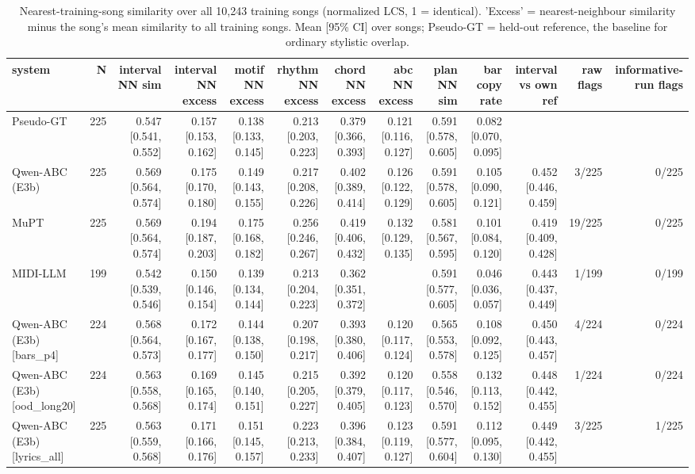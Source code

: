\begin{table}[t]
\centering
\small
\begin{tabular}{lrrrrrrrrrrrr}
\toprule
system & N & interval NN sim & interval NN excess & motif NN excess & rhythm NN excess & chord NN excess & abc NN excess & plan NN sim & bar copy rate & interval vs own ref & raw flags & informative-run flags \\
\midrule
Pseudo-GT & 225 & 0.547 [0.541, 0.552] & 0.157 [0.153, 0.162] & 0.138 [0.133, 0.145] & 0.213 [0.203, 0.223] & 0.379 [0.366, 0.393] & 0.121 [0.116, 0.127] & 0.591 [0.578, 0.605] & 0.082 [0.070, 0.095] &  &  &  \\
Qwen-ABC (E3b) & 225 & 0.569 [0.564, 0.574] & 0.175 [0.170, 0.180] & 0.149 [0.143, 0.155] & 0.217 [0.208, 0.226] & 0.402 [0.389, 0.414] & 0.126 [0.122, 0.129] & 0.591 [0.578, 0.605] & 0.105 [0.090, 0.121] & 0.452 [0.446, 0.459] & 3/225 & 0/225 \\
MuPT & 225 & 0.569 [0.564, 0.574] & 0.194 [0.187, 0.203] & 0.175 [0.168, 0.182] & 0.256 [0.246, 0.267] & 0.419 [0.406, 0.432] & 0.132 [0.129, 0.135] & 0.581 [0.567, 0.595] & 0.101 [0.084, 0.120] & 0.419 [0.409, 0.428] & 19/225 & 0/225 \\
MIDI-LLM & 199 & 0.542 [0.539, 0.546] & 0.150 [0.146, 0.154] & 0.139 [0.134, 0.144] & 0.213 [0.204, 0.223] & 0.362 [0.351, 0.372] &  & 0.591 [0.577, 0.605] & 0.046 [0.036, 0.057] & 0.443 [0.437, 0.449] & 1/199 & 0/199 \\
Qwen-ABC (E3b) [bars\_p4] & 224 & 0.568 [0.564, 0.573] & 0.172 [0.167, 0.177] & 0.144 [0.138, 0.150] & 0.207 [0.198, 0.217] & 0.393 [0.380, 0.406] & 0.120 [0.117, 0.124] & 0.565 [0.553, 0.578] & 0.108 [0.092, 0.125] & 0.450 [0.443, 0.457] & 4/224 & 0/224 \\
Qwen-ABC (E3b) [ood\_long20] & 224 & 0.563 [0.558, 0.568] & 0.169 [0.165, 0.174] & 0.145 [0.140, 0.151] & 0.215 [0.205, 0.227] & 0.392 [0.379, 0.405] & 0.120 [0.117, 0.123] & 0.558 [0.546, 0.570] & 0.132 [0.113, 0.152] & 0.448 [0.442, 0.455] & 1/224 & 0/224 \\
Qwen-ABC (E3b) [lyrics\_all] & 225 & 0.563 [0.559, 0.568] & 0.171 [0.166, 0.176] & 0.151 [0.145, 0.157] & 0.223 [0.213, 0.233] & 0.396 [0.384, 0.407] & 0.123 [0.119, 0.127] & 0.591 [0.577, 0.604] & 0.112 [0.095, 0.130] & 0.449 [0.442, 0.455] & 3/225 & 1/225 \\
\bottomrule
\end{tabular}
\caption{Nearest-training-song similarity over all 10,243 training songs (normalized LCS, 1 = identical). 'Excess' = nearest-neighbour similarity minus the song's mean similarity to all training songs. Mean [95\% CI] over songs; Pseudo-GT = held-out reference, the baseline for ordinary stylistic overlap.}
\label{tab:memorization}
\end{table}
